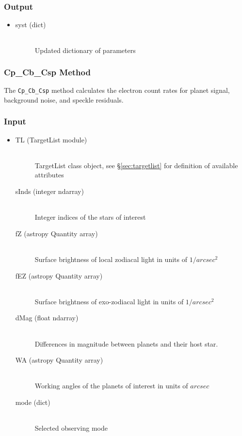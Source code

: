 \documentclass[cleanfoot]{asme2ej}
\begin{document}
\subsubsection*{Output}
\begin{itemize}
\item
\begin{description}
    \item[syst (dict)] \hfill \\ Updated dictionary of parameters
\end{description}
\end{itemize}

\subsubsection{Cp\_Cb\_Csp Method} \label{sec:CpCbCsptask}
The \verb+Cp_Cb_Csp+ method calculates the electron count rates for planet signal, background noise, and speckle residuals.
\subsubsection*{Input}
\begin{itemize}
\item 
    \begin{description}
    \item[TL (TargetList module)] \hfill \\ TargetList class object, see \S\ref{sec:targetlist} for definition of available attributes
    \item[sInds (integer ndarray)] \hfill \\ Integer indices of the stars of interest
    \item[fZ (astropy Quantity array)] \hfill \\ Surface brightness of local zodiacal light in units of $ 1/arcsec^2 $
    \item[fEZ (astropy Quantity array)] \hfill \\ Surface brightness of exo-zodiacal light in units of $ 1/arcsec^2 $
    \item[dMag (float ndarray)] \hfill \\ Differences in magnitude between planets and their host star.
    \item[WA (astropy Quantity array)] \hfill \\ Working angles of the planets of interest in units of $arcsec$
    \item[mode (dict)] \hfill \\ Selected observing mode
\end{description}
\end{itemize}
\end{document}
